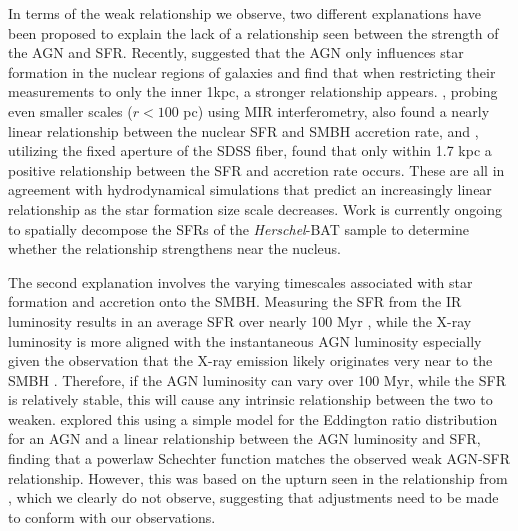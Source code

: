 \documentclass[fleqn, usenatbib]{mnras}
\newcommand{\herschel}{\emph{Herschel}}
\begin{document}
In terms of the weak relationship we observe, two different explanations have been proposed to explain the lack of a relationship seen between the strength of the AGN and SFR. Recently, \citet{Diamond-Stanic:2012rw} suggested that the AGN only influences star formation in the nuclear regions of galaxies and find that when restricting their measurements to only the inner 1kpc, a stronger relationship appears. \citet{Esquej:2014vl}, probing even smaller scales ($r < 100$ pc) using MIR interferometry, also found a nearly linear relationship between the nuclear SFR and SMBH accretion rate, and  \citet{LaMassa:2013hb}, utilizing the fixed aperture of the SDSS fiber, found that only within 1.7 kpc a positive relationship between the SFR and accretion rate occurs. These are all in agreement with hydrodynamical simulations \citep{Hopkins:2010kx, Thacker:2014pd} that predict an increasingly linear relationship as the star formation size scale decreases. Work is currently ongoing to spatially decompose the SFRs of the \herschel-BAT sample to determine whether the relationship strengthens near the nucleus. %

The second explanation involves the varying timescales associated with star formation and accretion onto the SMBH. Measuring the SFR from the IR luminosity results in an average SFR over nearly 100 Myr \citep{Kennicutt:2012it}, while the X-ray luminosity is more aligned with the instantaneous AGN luminosity especially given the observation that the X-ray emission likely originates very near to the SMBH \citep[e.g.][]{Chen:2011lr}. Therefore, if the AGN luminosity can vary over 100 Myr, while the SFR is relatively stable, this will cause any intrinsic relationship between the two to weaken. \citet{Hickox:2014yq} explored this using a simple model for the Eddington ratio distribution for an AGN and a linear relationship between the AGN luminosity and SFR, finding that a powerlaw Schechter function matches the observed weak AGN-SFR relationship. However, this was based on the upturn seen in the relationship from \citet{Rosario:2012fr}, which we clearly do not observe, suggesting that adjustments need to be made to conform with our observations.
\end{document}
